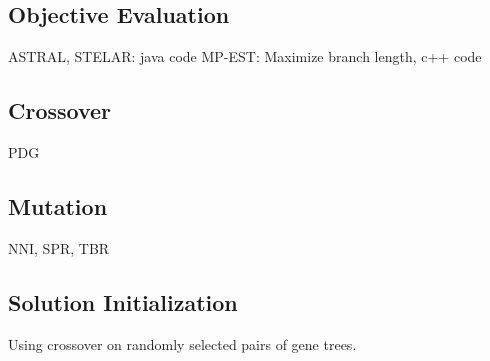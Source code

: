 \subsection{Objective Evaluation}
ASTRAL, STELAR: java code
MP-EST: Maximize branch length, c++ code
\subsection{Crossover}
PDG
\subsection{Mutation}
NNI, SPR, TBR
\subsection{Solution Initialization}
Using crossover on randomly selected pairs of gene trees.